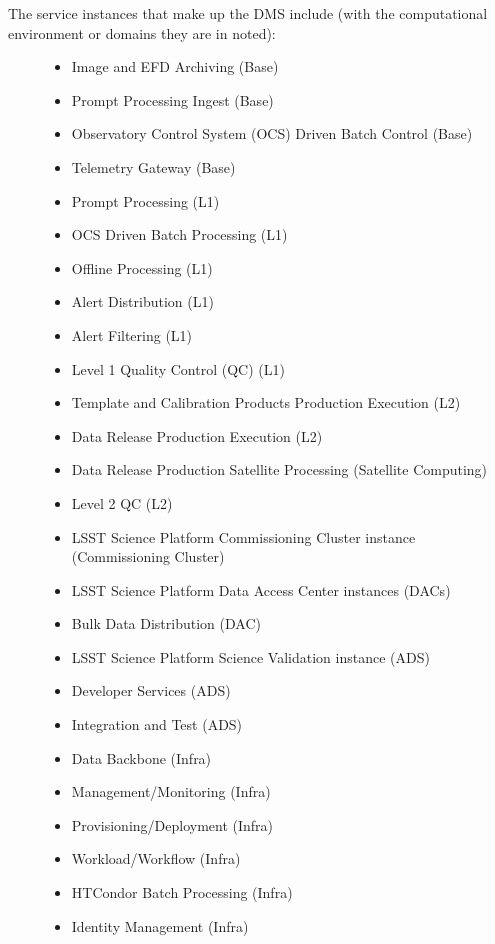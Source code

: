 \documentclass[DM,lsstdraft,toc]{lsstdoc}
\begin{document}
\begin{description}
\item[The service instances that make up the DMS include (with the
computational environment or domains they are in noted):]
\begin{itemize}
\tightlist
\item
  Image and EFD Archiving (Base)
\item
  Prompt Processing Ingest (Base)
\item
  Observatory Control System (OCS) Driven Batch Control (Base)
\item
  Telemetry Gateway (Base)
\item
  Prompt Processing (L1)
\item
  OCS Driven Batch Processing (L1)
\item
  Offline Processing (L1)
\item
  Alert Distribution (L1)
\item
  Alert Filtering (L1)
\item
  Level 1 Quality Control (QC) (L1)
\item
  Template and Calibration Products Production Execution (L2)
\item
  Data Release Production Execution (L2)
\item
  Data Release Production Satellite Processing (Satellite Computing)
\item
  Level 2 QC (L2)
\item
  LSST Science Platform Commissioning Cluster instance (Commissioning
  Cluster)
\item
  LSST Science Platform Data Access Center instances (DACs)
\item
  Bulk Data Distribution (DAC)
\item
  LSST Science Platform Science Validation instance (ADS)
\item
  Developer Services (ADS)
\item
  Integration and Test (ADS)
\item
  Data Backbone (Infra)
\item
  Management/Monitoring (Infra)
\item
  Provisioning/Deployment (Infra)
\item
  Workload/Workflow (Infra)
\item
  HTCondor Batch Processing (Infra)
\item
  Identity Management (Infra)
\end{itemize}
\end{description}
\end{document}
